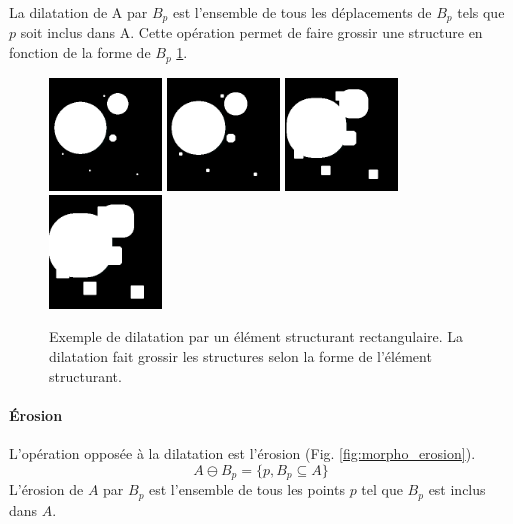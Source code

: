 La dilatation de A par $B_p$ est l'ensemble de tous les déplacements de $B_p$ tels que $p$ soit inclus dans A. Cette opération permet de faire grossir une structure en fonction de la forme de $B_p$ \ref{fig:morpho_dilation}.

  
  \begin{figure}[h]
    \centering
    \includegraphics[height=3cm]{Images/morpho_init.png}
    \includegraphics[height=3cm]{Images/morpho_dilate_k5.png}
    \includegraphics[height=3cm]{Images/morpho_dilate_k21.png}
    \includegraphics[height=3cm]{Images/morpho_dilate_k31.png}
    \caption{Exemple de dilatation par un élément structurant rectangulaire. La dilatation fait grossir les structures selon la forme de l'élément structurant.}
    \label{fig:morpho_dilation}
  \end{figure}
  
  \paragraph{Érosion}
  L'opération opposée à la dilatation est l'érosion (Fig. \ref{fig:morpho_erosion}).
  \begin{equation}
    A \ominus B_p = \{p, B_p \subseteq A\}
  \end{equation}
  L'érosion de $A$ par $B_p$ est l'ensemble de tous les points $p$ tel que $B_p$ est inclus dans $A$. 
  
